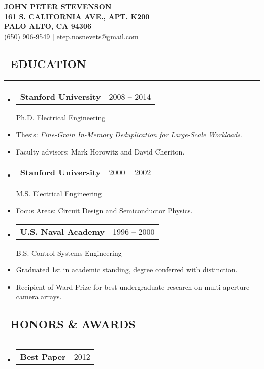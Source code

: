 \documentclass[10pt,letterpaper]{article}
\makeatletter
\newenvironment{changemargin}[2]
{%
    \begin{list}{}{%
        \setlength{\topsep}{0pt}%
        \setlength{\leftmargin}{#1}%
        \setlength{\rightmargin}{#2}%
        \setlength{\listparindent}{\parindent}%
        \setlength{\itemindent}{\parindent}%
        \setlength{\parsep}{\parskip}%
    }%
    \item[]
}%
{%
    \end{list}
}%
\newenvironment{content}
{%
    \begin{changemargin}{0cm}{2.5cm}
    \begin{itemize*}
        \vspace{-0.15em}
}%
{%
    \end{itemize*}
    \end{changemargin}
}%
\newenvironment{resumesection}[1]
{%
    \subsection*{\ #1}
    \vspace{-0.4em}
    \hrule
    \vspace{+0.4em}
    \begin{itemize}[leftmargin=0.15cm]
        \parskip=0.1em
}%
{%
    \end{itemize}
}%
\newcommand{\headerrowx}[2]
{\item[] \begin{tabular*}{\linewidth}{l@{\extracolsep{\fill}}r}
	#1 &
	#2 \\
\end{tabular*}}
\makeatother
\begin{document}
\begin{center}
{\LARGE{ \textbf{JOHN PETER STEVENSON}}} \\
\vspace{0.5em}
\footnotesize{\textbf{161 S. CALIFORNIA AVE., APT. K200}}  \\
\footnotesize{\textbf{PALO ALTO, CA 94306              }}  \\
\footnotesize{{(650) 906-9549} | {etep.nosnevets@gmail.com}}
\end{center}

\begin{minipage}[t]{.35\textwidth}
\begin{resumesection}{EDUCATION}
    \headerrowx{\textbf{Stanford University}}{2008 -- 2014}
    
    Ph.D. Electrical Engineering
    \item[] Thesis: \emph{Fine-Grain In-Memory Deduplication for Large-Scale Workloads}.
    \item[] Faculty advisors: Mark Horowitz and David Cheriton.
    
    \headerrowx{\textbf{Stanford University}}{2000 -- 2002}
    
    M.S. Electrical Engineering
    \item[] Focus Areas: Circuit Design and Semiconductor Physics.
    
    \headerrowx{\textbf{U.S. Naval Academy}}{1996 -- 2000}
    
    B.S. Control Systems Engineering
    \item[] Graduated 1st in academic standing, degree conferred with distinction.
    \item[] Recipient of Ward Prize for best undergraduate research on multi-aperture camera arrays.
\end{resumesection}

\begin{resumesection}{HONORS \& AWARDS}
    \headerrowx{\textbf{Best Paper}}{2012}
    

\end{resumesection}
\end{minipage}
\end{document}
